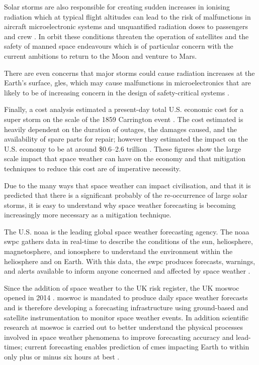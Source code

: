 Solar storms are also responsible for creating sudden increases in ionising radiation which at typical flight altitudes can lead to the risk of malfunctions in aircraft microelectronic systems and unquantified radiation doses to passengers and crew \citep{cannon_extreme_2013}. In orbit these conditions threaten the operation of satellites and the safety of manned space endeavours which is of particular concern with the current ambitions to return to the Moon and venture to Mars. 

There are even concerns that major storms could cause radiation increases at the Earth's surface, \glspl{gle}, which may cause malfunctions in microelectronics that are likely to be of increasing concern in the design of safety-critical systems \citep{cannon_extreme_2013}. 

Finally, a cost analysis estimated a present-day total U.S. economic cost for a super storm on the scale of the 1859 Carrington event \citep{homeier_solar_2013}. The cost estimated is heavily dependent on the duration of outages, the damages caused, and the availability of spare parts for repair; however they estimated the impact on the U.S. economy to be at around \$0.6--2.6 trillion \citep{homeier_solar_2013}. These figures show the large scale impact that space weather can have on the economy and that mitigation techniques to reduce this cost are of imperative necessity.

Due to the many ways that space weather can impact civilisation, and that it is predicted that there is a significant probably of the re-occurrence of large solar storms, it is easy to understand why space weather forecasting is becoming increasingly more necessary as a mitigation technique. 

The U.S. \gls{noaa} is the leading global space weather forecasting agency. The \gls{noaa} \gls{swpc} gathers data in real-time to describe the conditions of the sun, heliosphere, magnetosphere, and ionosphere to understand the environment within the heliosphere and on Earth. With this data, the \gls{swpc} produces forecasts, warnings, and alerts available to inform anyone concerned and affected by space weather \citep{noaa_noaa_2018}. 

Since the addition of space weather to the UK risk register, the UK \gls{moswoc} opened in 2014 \citep{bis_space_2015}. \gls{moswoc} is mandated to produce daily space weather forecasts and is therefore developing a forecasting infrastructure using ground-based and satellite instrumentation to monitor space weather events. In addition scientific research at \gls{moswoc} is carried out to better understand the physical processes involved in space weather phenomena to improve forecasting accuracy and lead-times; current forecasting enables prediction of \glspl{cme} impacting Earth to within only plus or minus six hours at best \citep{metoffice_space_2013}.

